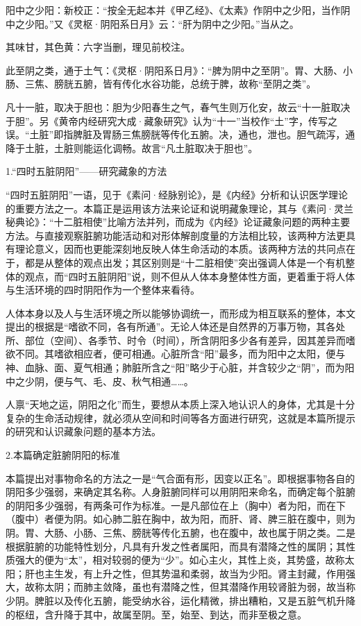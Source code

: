 \documentclass[12pt]{ctexbook}
\begin{document}
\begin{jiaozhu}
  \item 阳中之少阳：新校正：“按全无起本并《甲乙经》、《太素》作阴中之少阳，当作阴中之少阳。”又《灵枢·阴阳系日月》云：“肝为阴中之少阳。”当从之。
  \item 其味甘，其色黄：六字当删，理见前校注。
  \item 此至阴之类，通于土气：《灵枢·阴阳系日月》：“脾为阴中之至阴”。胃、大肠、小肠、三焦、膀胱五腑，皆有传化水谷功能，总统于脾，故称“至阴之类”。
  \item 凡十一脏，取决于胆也：胆为少阳春生之气，春气生则万化安，故云“十一脏取决于胆”。另《黄帝内经研究大成·藏象研究》认为“十一”当校作“土”字，传写之误。“土脏”即指脾脏及胃肠三焦膀胱等传化五腑。决，通也，泄也。胆气疏泻，通降于土脏，土脏则能运化调畅。故言“凡土脏取决于胆也”。
\end{jiaozhu}


1.“四时五脏阴阳”——研究藏象的方法

“四时五脏阴阳”一语，见于《素问·经脉别论》，是《内经》分析和认识医学理论的重要方法之一。本篇正是运用该方法来论证和说明藏象理论，其与《素问·灵兰秘典论》：“十二脏相使”比喻方法并列，而成为《内经》论证藏象问题的两种主要方法。与直接观察脏腑功能活动和对形体解剖度量的方法相比较，该两种方法更具有理论意义，因而也更能深刻地反映人体生命活动的本质。该两种方法的共冋点在于，都是从整体的观点出发；其区别则是“十二脏相使”突出强调人体是一个有机整体的观点，而“四时五脏阴阳”说，则不但从人体本身整体性方面，更着重于将人体与生活环境的四时阴阳作为一个整体来看待。

人体本身以及人与生活环境之所以能够协调统一，而形成为相互联系的整体，本文提出的根据是“嗜欲不同，各有所通”。无论人体还是自然界的万事万物，其各处所、部位（空间）、各季节、时令（时间），所含阴阳多少各有差异，因其差异而嗜欲不同。其嗜欲相应者，便可相通。心脏所含“阳”最多，而为阳中之太阳，便与神、血脉、面、夏气相通；肺脏所含之“阳”略少于心脏，并含较少之“阴”，而为阳中之少阴，便与气、毛、皮、秋气相通……。

人禀“天地之运，阴阳之化”而生，要想从本质上深入地认识人的身体，尤其是十分复杂的生命活动规律，就必须从空间和时间等各方面进行研究，这就是本篇所提示的研究和认识藏象问题的基本方法。

2.本篇确定脏腑阴阳的标准

本篇提出对事物命名的方法之一是“气合面有形，因变以正名”。即根据事物各自的阴阳多少强弱，来确定其名称。人身脏腑同样可以用阴阳来命名，而确定每个脏腑的阴阳多少强弱，有两条可作为标准。一是凡部位在上（胸中）者为阳，而在下（腹中）者便为阴。如心肺二脏在胸中，故为阳，而肝、肾、脾三脏在腹中，则为阴。胃、大肠、小肠、三焦、膀胱等传化五腑，也在腹中，故也属于阴之类。二是根据脏腑的功能特性划分，凡具有升发之性者属阳，而具有潜降之性的属阴；其性质强大的便为“太”，相对较弱的便为“少”。如心主火，其性上炎，其势盛，故称太阳；肝也主生发，有上升之性，但其势温和柔弱，故当为少阳。肾主封藏，作用强大，故称太阴；而肺主敛降，虽也有潜降之性，但其潜降作用较肾脏为弱，故当称少阴。脾脏以及传化五腑，能受纳水谷，运化精微，排出糟粕，又是五脏气机升降的枢纽，含升降于其中，故属至阴。至，始至、到达，而非至极之意。
\end{document}
